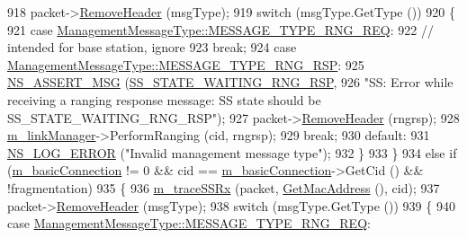 \begin{DoxyCode}
918           packet->\hyperlink{classns3_1_1Packet_a0961eccf975d75f902d40956c93ba63e}{RemoveHeader} (msgType);
919           \textcolor{keywordflow}{switch} (msgType.GetType ())
920             \{
921             \textcolor{keywordflow}{case} \hyperlink{classns3_1_1ManagementMessageType_a0e0c7a1e263538f0379d1bdb015abe3dacef47c5246aa3c32cee3ac10411734fe}{ManagementMessageType::MESSAGE\_TYPE\_RNG\_REQ}:
922               \textcolor{comment}{// intended for base station, ignore}
923               \textcolor{keywordflow}{break};
924             \textcolor{keywordflow}{case} \hyperlink{classns3_1_1ManagementMessageType_a0e0c7a1e263538f0379d1bdb015abe3dacc6d687507c639e29ca78b926d6345e1}{ManagementMessageType::MESSAGE\_TYPE\_RNG\_RSP}:
925               \hyperlink{assert_8h_aff5ece9066c74e681e74999856f08539}{NS\_ASSERT\_MSG} (\hyperlink{classns3_1_1SubscriberStationNetDevice_af9f145bc05df1f18610a3d4b61ff9ee4acb68c803df0eb6a0f4cc41389f981db8}{SS\_STATE\_WAITING\_RNG\_RSP},
926                              \textcolor{stringliteral}{"SS: Error while receiving a ranging response message: SS state should be
       SS\_STATE\_WAITING\_RNG\_RSP"});
927               packet->\hyperlink{classns3_1_1Packet_a0961eccf975d75f902d40956c93ba63e}{RemoveHeader} (rngrsp);
928               \hyperlink{classns3_1_1SubscriberStationNetDevice_a24e7df59fb312c196318f0366b63c6e6}{m\_linkManager}->PerformRanging (cid, rngrsp);
929               \textcolor{keywordflow}{break};
930             \textcolor{keywordflow}{default}:
931               \hyperlink{group__logging_ga0261a8db1d4ac5f79417d117634fd455}{NS\_LOG\_ERROR} (\textcolor{stringliteral}{"Invalid management message type"});
932             \}
933         \}
934       \textcolor{keywordflow}{else} \textcolor{keywordflow}{if} (\hyperlink{classns3_1_1SubscriberStationNetDevice_ae166a9acaa0e8d720a106491ba9ea2fc}{m\_basicConnection} != 0 && cid == 
      \hyperlink{classns3_1_1SubscriberStationNetDevice_ae166a9acaa0e8d720a106491ba9ea2fc}{m\_basicConnection}->GetCid () && !fragmentation)
935         \{
936           \hyperlink{classns3_1_1SubscriberStationNetDevice_aa1771f784eeb694c5ad2035f97ee52e5}{m\_traceSSRx} (packet, \hyperlink{classns3_1_1WimaxNetDevice_aa02eb7f6de9c03f0b8f2e33e3c5b5559}{GetMacAddress} (), cid);
937           packet->\hyperlink{classns3_1_1Packet_a0961eccf975d75f902d40956c93ba63e}{RemoveHeader} (msgType);
938           \textcolor{keywordflow}{switch} (msgType.GetType ())
939             \{
940             \textcolor{keywordflow}{case} \hyperlink{classns3_1_1ManagementMessageType_a0e0c7a1e263538f0379d1bdb015abe3dacef47c5246aa3c32cee3ac10411734fe}{ManagementMessageType::MESSAGE\_TYPE\_RNG\_REQ}:

\end{DoxyCode}
